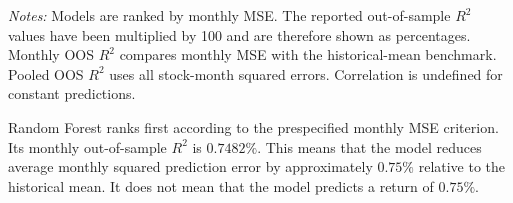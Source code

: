 \documentclass[11pt,a4paper]{article}
\begin{document}
\begin{table}[H]
\centering
\caption{Final test performance, 2020--2025}
\label{tab:test-results}

\small
\setlength{\tabcolsep}{3.8pt}


\vspace{0.3em}

\begin{minipage}{0.94\textwidth}
\footnotesize
\textit{Notes:}
Models are ranked by monthly MSE. The reported out-of-sample \(R^2\) values
have been multiplied by 100 and are therefore shown as percentages. Monthly
OOS \(R^2\) compares monthly MSE with the historical-mean benchmark. Pooled
OOS \(R^2\) uses all stock-month squared errors. Correlation is undefined for
constant predictions.
\end{minipage}
\end{table}

Random Forest ranks first according to the prespecified monthly MSE criterion.
Its monthly out-of-sample \(R^2\) is \(0.7482\%\). This means that the model
reduces average monthly squared prediction error by approximately \(0.75\%\)
relative to the historical mean. It does not mean that the model predicts a
return of \(0.75\%\).
\end{document}
